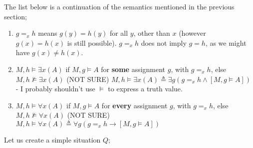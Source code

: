 \documentclass[a4paper, 12pt]{article}
\begin{document}
                The list below is a continuation of the semantics mentioned in the previous section;
                \begin{enumerate}[1.]
                    \itemsep0em
                    \setcounter{enumi}{5}
                    \item $g =_x h$ means $g(y) = h(y)$ for all $y$, other than $x$ (however $g(x) = h(x)$ is still possible). $g =_x h$ does not imply $g = h$, as we might have $g(x) \neq h(x)$.
                    \item $M, h \vDash \exists x (A)$ if $M, g \vDash A$ for \textbf{some} assignment $g$, with $g =_x h$, else $M, h \nvDash \exists x (A)$
                        \subitem (NOT SURE) $M, h \vDash \exists x (A) \triangleq \exists g (g =_x h \land [M, g \vDash A])$ - I probably shouldn't use $\vDash$ to express a truth value.
                    \item $M, h \vDash \forall x (A)$ if $M, g \vDash A$ for \textbf{every} assignment $g$, with $g =_x h$, else $M, h \nvDash \forall x (A)$
                        \subitem (NOT SURE) $M, h \vDash \forall x (A) \triangleq \forall g (g =_x h \rightarrow [M, g \vDash A])$
                \end{enumerate}
                Let us create a simple situation $Q$;
\end{document}
